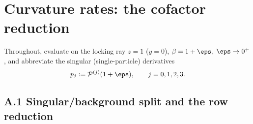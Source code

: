 %
\appendix
\section{Curvature rates: the cofactor reduction}\label{app:rates}

Throughout, evaluate on the locking ray $z=1$ ($y=0$), $\beta=1+\eps$, $\eps\to0^{+}$, and
abbreviate the singular (single-particle) derivatives
\[
   p_j:=\mathcal P^{(j)}(1+\eps),\qquad j=0,1,2,3 .
\]

\subsection*{A.1 Singular/background split and the row reduction}

